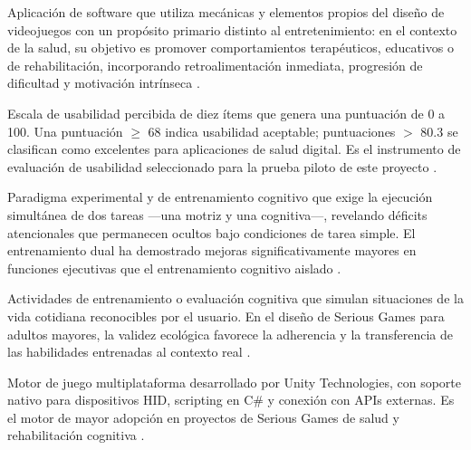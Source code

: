 \begin{description}[leftmargin=0pt, labelwidth=\textwidth, 
                    labelsep=0pt, style=nextline]
\item[\textbf{Serious Game}]
Aplicación de software que utiliza mecánicas y elementos propios del 
diseño de videojuegos con un propósito primario distinto al entretenimiento: 
en el contexto de la salud, su objetivo es promover comportamientos 
terapéuticos, educativos o de rehabilitación, incorporando retroalimentación 
inmediata, progresión de dificultad y motivación intrínseca 
\parencite{abd, Ortega2024}.

\item[\textbf{SUS (\textit{System Usability Scale})}]
Escala de usabilidad percibida de diez ítems que genera una puntuación 
de 0 a 100. Una puntuación $\geq$ 68 indica usabilidad aceptable; 
puntuaciones $>$ 80.3 se clasifican como excelentes para aplicaciones de 
salud digital. Es el instrumento de evaluación de usabilidad seleccionado 
para la prueba piloto de este proyecto \parencite{Peres2022SUS}.

\item[\textbf{Tarea dual (\textit{dual-task})}]
Paradigma experimental y de entrenamiento cognitivo que exige la 
ejecución simultánea de dos tareas —una motriz y una cognitiva—, 
revelando déficits atencionales que permanecen ocultos bajo condiciones 
de tarea simple. El entrenamiento dual ha demostrado mejoras 
significativamente mayores en funciones ejecutivas que el entrenamiento 
cognitivo aislado \parencite{Voelcker2025DualTask, Li2023DualTask}.

\item[\textbf{Tareas ecológicamente válidas}]
Actividades de entrenamiento o evaluación cognitiva que simulan 
situaciones de la vida cotidiana reconocibles por el usuario. En el diseño 
de Serious Games para adultos mayores, la validez ecológica favorece la 
adherencia y la transferencia de las habilidades entrenadas al contexto 
real \parencite{Ortega2024, Gardinger2024}.

\item[\textbf{Unity}]
Motor de juego multiplataforma desarrollado por Unity Technologies, con 
soporte nativo para dispositivos HID, scripting en C\# y conexión con 
APIs externas. Es el motor de mayor adopción en proyectos de Serious Games 
de salud y rehabilitación cognitiva \parencite{Ortega2024, Ribeiro2024}.


\end{description}
